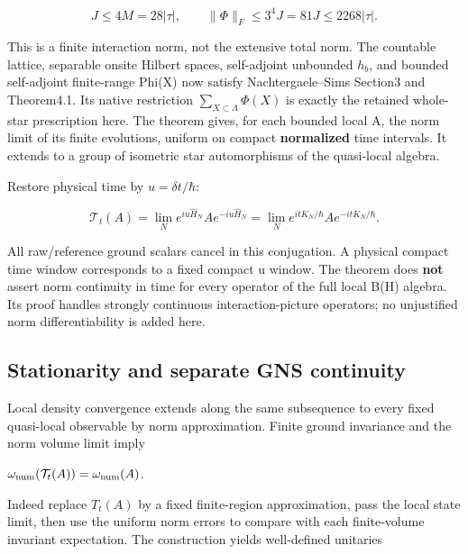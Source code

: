 \begin{equation}
J\le4M=28|\tau|,\qquad
\|\Phi\|_F\le3^4J=81J\le2268|\tau|.\tag{HNM-AQ1.3}
\label{r29:aq1:eq3}
\end{equation}

This is a finite interaction norm, not the extensive total norm. The countable lattice, separable onsite Hilbert spaces, self-adjoint unbounded \(h_b\), and bounded self-adjoint finite-range Phi(X) now satisfy Nachtergaele--Sims Section3 and Theorem4.1. Its native restriction \(\sum_{X\subset\Lambda}\Phi(X)\) is exactly the retained whole-star prescription here. The theorem gives, for each bounded local A, the norm limit of its finite evolutions, uniform on compact \textbf{normalized} time intervals. It extends to a group of isometric star automorphisms of the quasi-local algebra.

Restore physical time by \(u=\delta t/\hbar\):

\begin{equation}
\mathcal T_t(A)=\lim_N e^{iu\widehat H_N}A e^{-iu\widehat H_N}
=\lim_N e^{itK_N/\hbar}A e^{-itK_N/\hbar}.\tag{HNM-AQ1.4}
\label{r29:aq1:eq4}
\end{equation}

All raw/reference ground scalars cancel in this conjugation. A physical compact time window corresponds to a fixed compact u window. The theorem does \textbf{not} assert norm continuity in time for every operator of the full local B(H) algebra. Its proof handles strongly continuous interaction-picture operators; no unjustified norm differentiability is added here.

\hypertarget{r29-aq1-stationarity-and-separate-gns-continuity}{%
\subsection{Stationarity and separate GNS continuity}\label{r29:aq1:r29-aq1-stationarity-and-separate-gns-continuity}}

Local density convergence extends along the same subsequence to every fixed quasi-local observable by norm approximation. Finite ground invariance and the norm volume limit imply

\(\omega_{\rm num}(\mathcal T_t(A))=\omega_{\rm num}(A)\).

Indeed replace \(T_t(A)\) by a fixed finite-region approximation, pass the local state limit, then use the uniform norm errors to compare with each finite-volume invariant expectation. The construction yields well-defined unitaries

